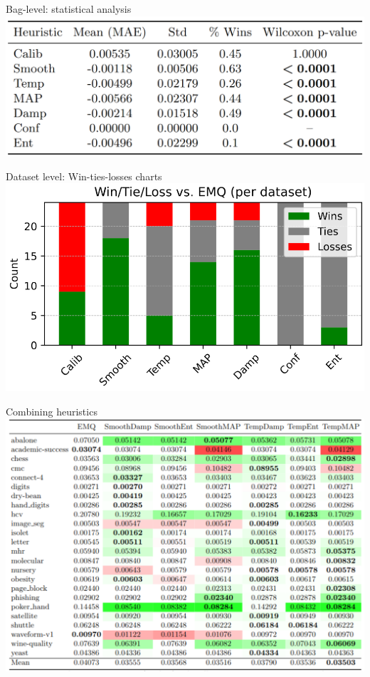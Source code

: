 \documentclass[aspectratio=169]{beamer}
\begin{document}
\begin{frame}{Bag-level: statistical analysis}
  \centering
  \includegraphics[width=0.6\linewidth]{images/statistical_analysis.png}
\end{frame}

\begin{frame}{Dataset level: Win-ties-losses charts}
  \centering
    \includegraphics[width=0.6\linewidth]{images/datasetlevel.png}
\end{frame}

\begin{frame}{Combining heuristics}
  \centering
    \includegraphics[width=0.6\linewidth]{images/combinations.png}
\end{frame}
\end{document}
